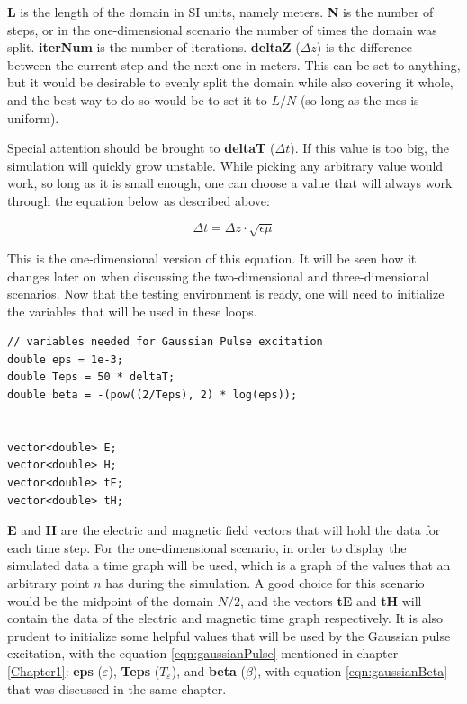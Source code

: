 \textbf{L} is the length of the domain in SI units, namely meters. \textbf{N} is the number of steps, or in the one-dimensional scenario the number of times the domain was split. \textbf{iterNum} is the number of iterations. \textbf{deltaZ} ($\Delta z$) is the difference between the current step and the next one in meters. This can be set to anything, but it would be desirable to evenly split the domain while also covering it whole, and the best way to do so would be to set it to $L/N$ (so long as the mes is uniform).

Special attention should be brought to \textbf{deltaT} ($\Delta t$). If this value is too big, the simulation will quickly grow unstable. While picking any arbitrary value would work, so long as it is small enough, one can choose a value that will always work through the equation below as described above:

\begin{equation}
	\label{eqn:deltaTcode}
	\Delta t = \Delta z \cdot \sqrt{\epsilon \mu}
\end{equation}

This is the one-dimensional version of this equation. It will be seen how it changes later on when discussing the two-dimensional and three-dimensional scenarios. Now that the testing environment is ready, one will need to initialize the variables that will be used in these loops.

\begin{verbatim}
// variables needed for Gaussian Pulse excitation
double eps = 1e-3;
double Teps = 50 * deltaT;
double beta = -(pow((2/Teps), 2) * log(eps));


vector<double> E;
vector<double> H;
vector<double> tE;
vector<double> tH;
\end{verbatim}

\textbf{E} and \textbf{H} are the electric and magnetic field vectors that will hold the data for each time step. For the one-dimensional scenario, in order to display the simulated data a time graph will be used, which is a graph of the values that an arbitrary point $n$ has during the simulation. A good choice  for this scenario would be the midpoint of the domain $N/2$, and the vectors \textbf{tE} and \textbf{tH} will contain the data of the electric and magnetic time graph respectively. It is also prudent to initialize some helpful values that will be used by the Gaussian pulse excitation, with the equation \ref{eqn:gaussianPulse} mentioned in chapter \ref{Chapter1}: \textbf{eps} ($\varepsilon$), \textbf{Teps} ($T_\varepsilon$), and \textbf{beta} ($\beta$), with equation \ref{eqn:gaussianBeta} that was discussed in the same chapter.

